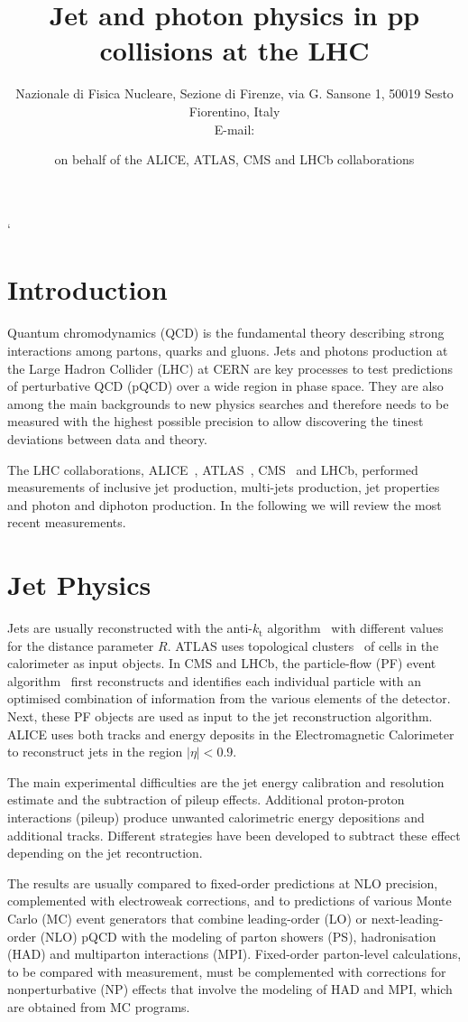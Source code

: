 \documentclass{PoS}
\title{Jet and photon physics in pp collisions at the LHC}
\author{\speaker{ Vitaliano Ciulli }%
Nazionale di Fisica Nucleare, Sezione di Firenze, via G. Sansone 1, 50019 Sesto Fiorentino, Italy \\ E-mail:
\email{vitaliano.ciulli@fi.infn.it}} \author{on behalf of the ALICE, ATLAS, CMS and LHCb collaborations}
\providecommand{\kts}{\ensuremath{k_{\mathrm{t}}}\xspace}
\begin{document}
`
\section{Introduction}

Quantum chromodynamics (QCD) is the fundamental theory describing strong interactions among partons, \ie quarks and
gluons. Jets and photons production at the Large Hadron Collider (LHC) at CERN are key processes to test predictions of
perturbative QCD (pQCD) over a wide region in phase space. They are also among the main backgrounds to new physics
searches and therefore needs to be measured with the highest possible precision to allow discovering the tinest
deviations between data and theory.

The LHC collaborations, ALICE~, ATLAS~\cite{Aad:2008zzm}, CMS~\cite{Chatrchyan:2008aa} and LHCb, performed
measurements of inclusive jet production, multi-jets production, jet properties and photon and diphoton production. 
In the following we will review the most recent measurements.

\section{Jet Physics}

Jets are usually reconstructed with the anti-\kts algorithm~\cite{Cacciari:2008gp} with different values for the distance parameter $R$.
ATLAS uses topological clusters~\cite{Lampl:2008zz} of cells in the calorimeter as input objects. 
In CMS and LHCb, the particle-flow (PF) event algorithm~\cite{CMS:2009nxa}
first reconstructs and identifies each individual particle with an optimised
combination of information from the various elements of the detector. Next, these PF objects are used as input to the jet
reconstruction algorithm. ALICE uses both tracks and energy deposits in the
Electromagnetic Calorimeter to reconstruct jets in the region $|\eta|<0.9$.

The main experimental difficulties are the jet energy calibration and resolution estimate and the subtraction of pileup
effects. Additional proton-proton interactions (pileup) produce unwanted calorimetric energy depositions and additional
tracks. Different strategies have been developed to subtract these effect depending on the jet recontruction.

The results are usually compared to fixed-order predictions at NLO precision, complemented with electroweak corrections, and to predictions of
various Monte Carlo (MC) event generators that combine leading-order (LO) or next-leading-order (NLO) pQCD with the modeling of parton
showers (PS), hadronisation (HAD) and multiparton interactions (MPI).
Fixed-order parton-level calculations, to be compared with measurement, must be complemented with corrections for nonperturbative
(NP) effects that involve the modeling of HAD and MPI, which are obtained from MC programs. 
\end{document}
